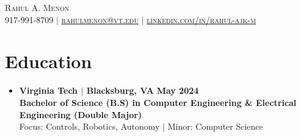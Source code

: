 \documentclass[letterpaper,11pt]{article}
\begin{document}
\pagestyle{empty} %

\begin{center}
    \Huge \scshape Rahul A. Menon \\
    \small 917-991-8709 $|$ \href{mailto:rahulmenon@vt.edu}{\underline{rahulmenon@vt.edu}} $|$ 
    \href{https://www.linkedin.com/in/rahul-ajk-m}{\underline{linkedin.com/in/rahul-ajk-m}} 
\end{center}

\vspace{-\baselineskip} %
\vspace{-0.5\baselineskip} %

\section{Education}
\begin{itemize}[leftmargin=0mm, label={}]
  \item \textbf{Virginia Tech $|$ \textnormal{Blacksburg, VA}} \hfill {\textbf{May 2024}} \\
  \textbf{Bachelor of Science (B.S) in Computer Engineering \& Electrical Engineering (Double Major)} \\
  Focus: Controls, Robotics, Autonomy $|$ Minor: Computer Science
\end{itemize}

\vspace{-1\baselineskip} %
\vspace{-0.35\baselineskip} %


\end{document}
